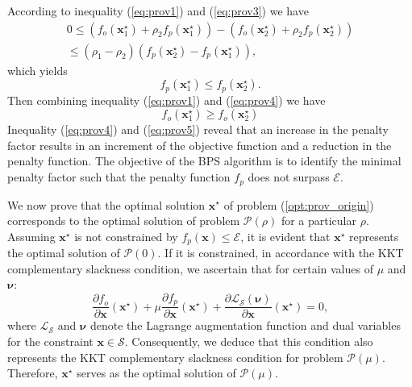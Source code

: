 According to inequality (\ref{eq:prov1}) and (\ref{eq:prov3}) we have
\begin{equation}
\begin{aligned}
    0\leq\left(f_o(\mathbf{x}_1^{\star})+\rho_2f_p(\mathbf{x}_1^{\star})\right) - \left(f_o(\mathbf{x}_2^{\star})+\rho_2f_p(\mathbf{x}_2^{\star})\right)
    \\ \leq
    (\rho_1-\rho_2)(f_p(\mathbf{x}_2^{\star})-f_p(\mathbf{x}_1^{\star})),
\end{aligned}
\end{equation}
which yields
\begin{equation}
\label{eq:prov4}
    f_p(\mathbf{x}_1^{\star})\leq f_p(\mathbf{x}_2^{\star}).
\end{equation}
Then combining inequality (\ref{eq:prov1}) and (\ref{eq:prov4}) we have
\begin{equation}
\label{eq:prov5}
    f_o(\mathbf{x}_1^{\star})\geq f_o(\mathbf{x}_2^{\star})
\end{equation}
Inequality (\ref{eq:prov4}) and (\ref{eq:prov5}) reveal that an increase in the penalty factor results in an increment of the objective function and a reduction in the penalty function. The objective of the BPS algorithm is to identify the minimal penalty factor such that the penalty function $f_p$ does not surpass $\mathcal{E}$.

We now prove that the optimal solution $\mathbf{x}^{\star}$ of problem (\ref{opt:prov_origin}) corresponds to the optimal solution of problem $\mathcal{P}(\rho)$ for a particular $\rho$. Assuming $\mathbf{x}^{\star}$ is not constrained by $f_p(\mathbf{x})\leq\mathcal{E}$, it is evident that $\mathbf{x}^{\star}$ represents the optimal solution of $\mathcal{P}(0)$. If it is constrained, in accordance with the KKT complementary slackness condition, we ascertain that for certain values of $\mu$ and $\bm{\nu}$:
\begin{equation}
    \frac{\partial f_o}{\partial\mathbf{x}}(\mathbf{x}^{\star})+\mu\frac{\partial f_p}{\partial\mathbf{x}}(\mathbf{x}^{\star})+\frac{\partial{\mathcal{L}_{\mathcal{S}}(\bm{\nu})}}{\partial\mathbf{x}}(\mathbf{x}^{\star})=0,
\end{equation}
where $\mathcal{L}_{\mathcal{S}}$ and $\bm{\nu}$ denote the Lagrange augmentation function and dual variables for the constraint $\mathbf{x}\in\mathcal{S}$. Consequently, we deduce that this condition also represents the KKT complementary slackness condition for problem $\mathcal{P}(\mu)$. Therefore, $\mathbf{x}^{\star}$ serves as the optimal solution of $\mathcal{P}(\mu)$.